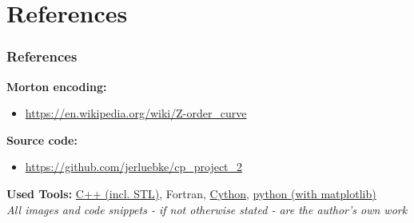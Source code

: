 \section{References}
\begin{frame}
    \frametitle{References}
    \textbf{Morton encoding:}
    \begin{itemize}
    \item \url{https://en.wikipedia.org/wiki/Z-order_curve} \\
    \end{itemize}
    \textbf{Source code:}
    \begin{itemize}
        \item \url{https://github.com/jerluebke/cp_project_2}
    \end{itemize}
    \textbf{Used Tools:}
    \href{https://en.cppreference.com/w/cpp/container}{C++ (incl. STL)},
    Fortran,
    \href{https://cython.org/}{Cython},
    \href{https://matplotlib.org/}{python (with matplotlib)}
    \vspace*{\baselineskip} \\
    {\footnotesize\textit{All images and code snippets - if not otherwise stated - are
    the author's own work}}
\end{frame}

